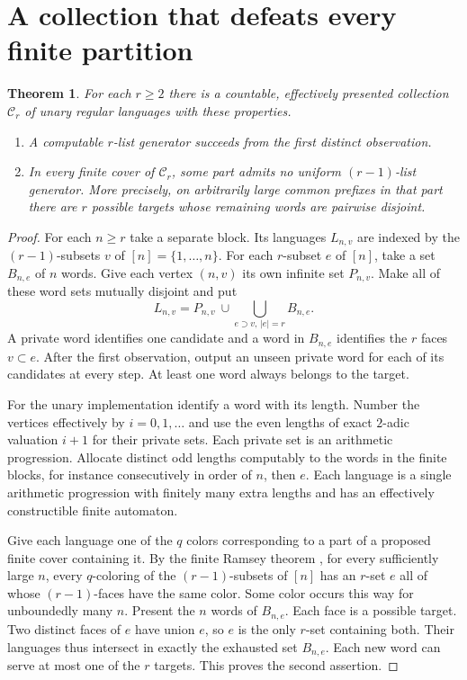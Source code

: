 \documentclass[11pt]{article}
\newtheorem{theorem}{Theorem}
\newcommand{\C}{\mathcal C}
\begin{document}
\section{A collection that defeats every finite partition}
\begin{theorem}\label{sep}
For each $r\ge2$ there is a countable, effectively presented collection $\C_r$ of unary regular languages with these properties.
\begin{enumerate}
\item A computable $r$-list generator succeeds from the first distinct observation.
\item In every finite cover of $\C_r$, some part admits no uniform $(r-1)$-list generator. More precisely, on arbitrarily large common prefixes in that part there are $r$ possible targets whose remaining words are pairwise disjoint.
\end{enumerate}
\end{theorem}
\begin{proof}
For each $n\ge r$ take a separate block. Its languages $L_{n,v}$ are indexed by the $(r-1)$-subsets $v$ of $[n]=\{1,\ldots,n\}$. For each $r$-subset $e$ of $[n]$, take a set $B_{n,e}$ of $n$ words. Give each vertex $(n,v)$ its own infinite set $P_{n,v}$. Make all of these word sets mutually disjoint and put
\[
 L_{n,v}=P_{n,v}\ \cup\!\bigcup_{e\supset v,\,|e|=r} B_{n,e}.
\]
A private word identifies one candidate and a word in $B_{n,e}$ identifies the $r$ faces $v\subset e$. After the first observation, output an unseen private word for each of its candidates at every step. At least one word always belongs to the target.

For the unary implementation identify a word with its length. Number the vertices effectively by $i=0,1,\dots$ and use the even lengths of exact $2$-adic valuation $i+1$ for their private sets. Each private set is an arithmetic progression. Allocate distinct odd lengths computably to the words in the finite blocks, for instance consecutively in order of $n$, then $e$. Each language is a single arithmetic progression with finitely many extra lengths and has an effectively constructible finite automaton.

Give each language one of the $q$ colors corresponding to a part of a proposed finite cover containing it. By the finite Ramsey theorem \cite{ramsey}, for every sufficiently large $n$, every $q$-coloring of the $(r-1)$-subsets of $[n]$ has an $r$-set $e$ all of whose $(r-1)$-faces have the same color. Some color occurs this way for unboundedly many $n$. Present the $n$ words of $B_{n,e}$. Each face is a possible target. Two distinct faces of $e$ have union $e$, so $e$ is the only $r$-set containing both. Their languages thus intersect in exactly the exhausted set $B_{n,e}$. Each new word can serve at most one of the $r$ targets. This proves the second assertion.
\end{proof}
\end{document}
